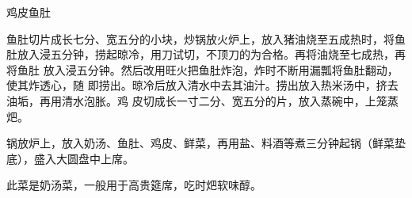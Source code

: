 %
%
%
%
%
%
%
\begin{recipe}{鸡皮鱼肚}

\ingredients


\preparation

\step 鱼肚切片成长七分、宽五分的小块，炒锅放火炉上，放入猪油烧至五成热时，将鱼
肚放入浸五分钟，捞起晾冷，用刀试切，不顶刀的为合格。再将油烧至七成热，再将鱼肚
放入浸五分钟。然后改用旺火把鱼肚炸泡，炸时不断用漏瓢将鱼肚翻动，使其炸透心，随
即捞出。晾冷后放入清水中去其油汁。捞出放入热米汤中，挤去油垢，再用清水泡胀。鸡
皮切成长一寸二分、宽五分的片，放入蒸碗中，上笼蒸𤆵。

\step 锅放炉上，放入奶汤、鱼肚、鸡皮、鲜菜，再用盐、料酒等煮三分钟起锅（鲜菜垫
底），盛入大圆盘中上席。

\features

此菜是奶汤菜，一般用于高贵筵席，吃时𤆵软味醇。

\end{recipe}

